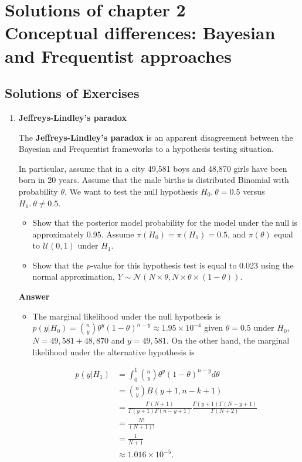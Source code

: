 \chapter{Solutions of chapter 2\\
Conceptual differences: Bayesian and Frequentist approaches}\label{chap2}
\section{Solutions of Exercises}\label{sec21}
\begin{enumerate}[leftmargin=*]
\item \textbf{Jeffreys-Lindley's paradox}

The \textbf{Jeffreys-Lindley's paradox} \cite{Jeffreys1961,lindley1957statistical} is an apparent disagreement between the Bayesian and Frequentist frameworks to a hypothesis testing situation.

In particular, assume that in a city 49,581 boys and 48,870 girls have been born in 20 years. Assume that the male births is distributed Binomial with probability $\theta$. We want to test the null hypothesis $H_0. \ \theta=0.5$ versus $H_1. \ \theta\neq 0.5$.

\begin{itemize}
	\item Show that the posterior model probability for the model under the null is approximately 0.95. Assume $\pi(H_0)=\pi(H_1)=0.5$, and $\pi(\theta)$ equal to $\mathcal{U}(0,1)$ under $H_1$.
	\item Show that the \textit{p}-value for this hypothesis test is equal to 0.023 using the normal approximation, $Y\sim \mathcal{N}(N\times \theta, N\times \theta \times (1-\theta))$. 
\end{itemize}

\textbf{Answer}

\begin{itemize}
	\item The marginal likelihood under the null hypothesis is $p(y|H_0)={n \choose y}\theta^y(1-\theta)^{n-y}\approx 1.95\times 10^{-4}$ given $\theta=0.5$ under $H_0$, $N=49,581+48,870$ and $y=49,581$. On the other hand, the marginal likelihood under the alternative hypothesis is

\begin{align*}
	p(y|H_1)&=\int_{0}^{1}{n \choose y}\theta^y(1-\theta)^{n-y}d\theta\\
	&={n \choose y} B(y+1, n-k+1)\\
	&=\frac{\Gamma(N+1)}{\Gamma(y+1)\Gamma(n-y+1)}\frac{\Gamma(y+1)\Gamma(N-y+1)}{\Gamma(N+2)}\\
	&=\frac{N!}{(N+1)!}\\
	&=\frac{1}{N+1}\\
	&\approx1.016\times 10^{-5}. 
\end{align*}


\end{itemize}
\end{enumerate}
